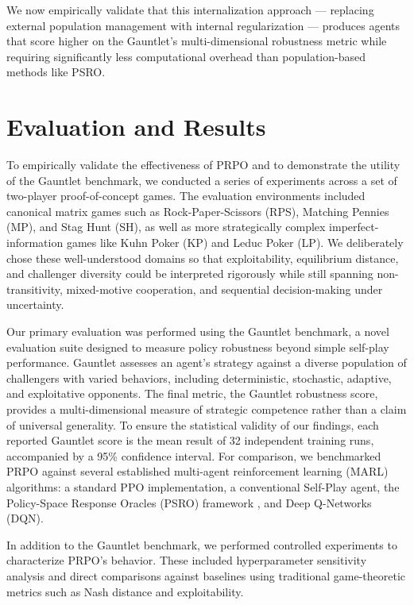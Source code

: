 \documentclass[sigconf,anonymous]{aamas}
\begin{document}
We now empirically validate that this internalization approach --- replacing external population management with internal regularization --- produces agents that score higher on the Gauntlet's multi-dimensional robustness metric while requiring significantly less computational overhead than population-based methods like PSRO.


\section{Evaluation and Results}
\label{sec:results}

To empirically validate the effectiveness of PRPO and to demonstrate the utility of the Gauntlet benchmark, we conducted a series of experiments across a set of two-player proof-of-concept games. The evaluation environments included canonical matrix games such as Rock-Paper-Scissors (RPS), Matching Pennies (MP), and Stag Hunt (SH), as well as more strategically complex imperfect-information games like Kuhn Poker (KP) and Leduc Poker (LP). We deliberately chose these well-understood domains so that exploitability, equilibrium distance, and challenger diversity could be interpreted rigorously while still spanning non-transitivity, mixed-motive cooperation, and sequential decision-making under uncertainty.

Our primary evaluation was performed using the Gauntlet benchmark, a novel evaluation suite designed to measure policy robustness beyond simple self-play performance. Gauntlet assesses an agent's strategy against a diverse population of challengers with varied behaviors, including deterministic, stochastic, adaptive, and exploitative opponents. The final metric, the Gauntlet robustness score, provides a multi-dimensional measure of strategic competence rather than a claim of universal generality. To ensure the statistical validity of our findings, each reported Gauntlet score is the mean result of 32 independent training runs, accompanied by a 95\% confidence interval. For comparison, we benchmarked PRPO against several established multi-agent reinforcement learning (MARL) algorithms: a standard PPO implementation, a conventional Self-Play agent, the Policy-Space Response Oracles (PSRO) framework \cite{Lanctot2017}, and Deep Q-Networks (DQN).

In addition to the Gauntlet benchmark, we performed controlled experiments to characterize PRPO's behavior. These included hyperparameter sensitivity analysis and direct comparisons against baselines using traditional game-theoretic metrics such as Nash distance and exploitability.
\end{document}
